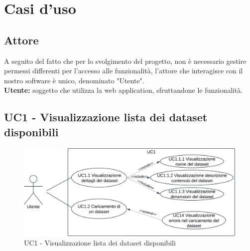 \section{Casi d'uso}
\subsection{Attore}
A seguito del fatto che per lo svolgimento del progetto, non è necessario gestire permessi differenti per l'accesso alle funzionalità, l'attore che interagisce con il nostro software è unico, denominato "Utente".\\
\textbf{Utente:} soggetto che utilizza la web application, sfruttandone le funzionalità.
\subsection{UC1 - Visualizzazione lista dei dataset disponibili}
\begin{figure}[h!]
    \centering
    \includegraphics[scale=0.7]{template/images/UC1.png}
    \caption{UC1 - Visualizzazione lista dei dataset disponibili}
\end{figure}
